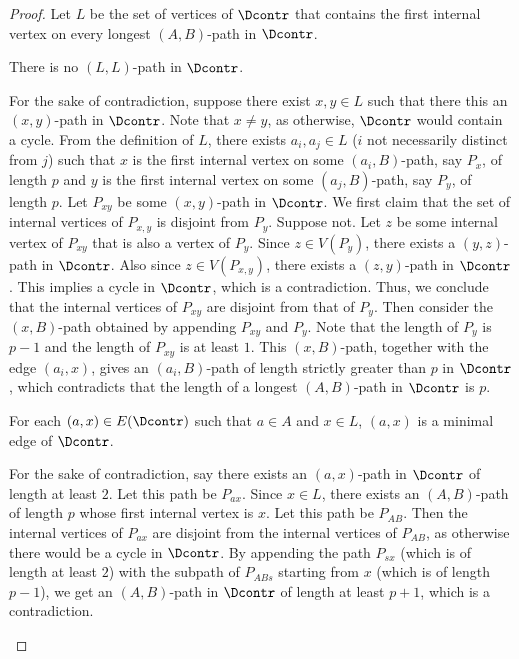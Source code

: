 \begin{proof}
Let $L$ be the set of vertices of $\Dcontr$ that contains the first internal vertex on every longest $(A,B)$-path in $\Dcontr$.

\begin{claim}\label{claim:biclique6}
There is no $(L,L)$-path in $\Dcontr$.
\end{claim}

\begin{claimproof}
For the sake of contradiction, suppose there exist $x,y \in L$ such that there this an $(x,y)$-path in $\Dcontr$. Note that $x\neq y$, as otherwise, $\Dcontr$ would contain a cycle.
From the definition of $L$, there exists $a_i,a_j \in L$ ($i$ not necessarily distinct from $j$) such that $x$ is the first internal vertex on some $(a_i,B)$-path, say $P_x$, of length $p$ and $y$ is the first internal vertex on some $(a_j,B)$-path, say $P_y$, of length $p$. 
Let $P_{xy}$ be some $(x,y)$-path in $\Dcontr$. We first claim that the set of internal vertices of $P_{x,y}$ is disjoint from $P_y$. Suppose not. Let $z$ be some internal vertex of $P_{xy}$ that is also a vertex of $P_y$. Since $z \in V(P_y)$, there exists a $(y,z)$-path in $\Dcontr$. Also since $z \in V(P_{x,y})$, there exists a $(z,y)$-path in $\Dcontr$. This implies a cycle in $\Dcontr$, which is a contradiction. Thus, we conclude that the internal vertices of $P_{xy}$ are disjoint from that of $P_y$. Then consider the $(x,B)$-path obtained by appending $P_{xy}$ and $P_y$. Note that the length of $P_y$ is $p-1$ and the length of $P_{xy}$ is at least $1$. This $(x,B)$-path, together with the edge $(a_i,x)$, gives an $(a_i,B)$-path of length strictly greater than $p$ in $\Dcontr$, which contradicts that the length of a longest $(A,B)$-path in $\Dcontr$ is $p$.
\end{claimproof}

\begin{claim}\label{claim:biclique7}
For each $(a,x) \in E(\Dcontr)$ such that $a \in A$ and $x \in L$, $(a,x)$ is a minimal edge of $\Dcontr$. 
\end{claim}

\begin{claimproof}
For the sake of contradiction, say there exists an $(a,x)$-path in $\Dcontr$ of length at least $2$. Let this path be $P_{ax}$. Since $x \in L$, there exists an $(A,B)$-path of length $p$ whose first internal vertex is $x$. Let this path be $P_{AB}$. Then the internal vertices of $P_{ax}$ are disjoint from the internal vertices of $P_{AB}$, as otherwise there would be a cycle in $\Dcontr$. By appending the path $P_{sx}$ (which is of length at least $2$) with the subpath of $P_{ABs}$ starting from $x$ (which is of length $p-1$), we get an $(A,B)$-path in $\Dcontr$ of length at least $p+1$, which is a contradiction.
\end{claimproof}


\end{proof}
